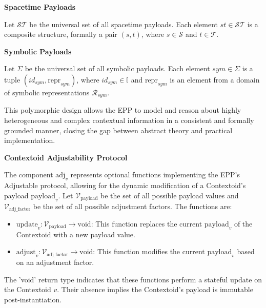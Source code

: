 \textbf{Spacetime Payloads}\newline 

\begin{definition}
\label{def:contextoid_paylod_spacetime}
Let \(\mathcal{ST}\) be the universal set of all spacetime payloads. Each element \(st \in \mathcal{ST}\) is a composite structure, formally a pair \( (s, t) \), where \(s \in \mathcal{S}\) and \(t \in \mathcal{T}\).
\end{definition}

\textbf{Symbolic Payloads}\newline 

\begin{definition}
\label{def:contextoid_paylod_symbolic}
Let \(\Sigma\) be the universal set of all symbolic payloads. Each element \(sym \in \Sigma\) is a tuple \( (id_{sym}, \text{repr}_{sym}) \), where \(id_{sym} \in \mathbb{I}\) and \(\text{repr}_{sym}\) is an element from a domain of symbolic representations \(\mathcal{R}_{sym}\).
\end{definition}

This polymorphic design allows the EPP to model and reason about highly heterogeneous and complex contextual information in a consistent and formally grounded manner, closing the gap between abstract theory and practical implementation.

\textbf{Contextoid Adjustability Protocol }
        
        The component \( \text{adj}_v \) represents optional functions implementing the EPP's Adjustable protocol, allowing for the dynamic modification of a Contextoid's payload \( \text{payload}_v \).
        Let \(\mathcal{V}_{\text{payload}}\) be the set of all possible payload values and \(\mathcal{V}_{\text{adj\_factor}}\) be the set of all possible adjustment factors. The functions are:
        \begin{itemize}
            \item \( \text{update}_v: \mathcal{V}_{\text{payload}} \to \text{void} \): This function replaces the current \( \text{payload}_v \) of the Contextoid with a new payload value.
            \item \( \text{adjust}_v: \mathcal{V}_{\text{adj\_factor}} \to \text{void} \): This function modifies the current \( \text{payload}_v \) based on an adjustment factor.
        \end{itemize}
        The 'void' return type indicates that these functions perform a stateful update on the Contextoid \(v\). Their absence implies the Contextoid's payload is immutable post-instantiation.

